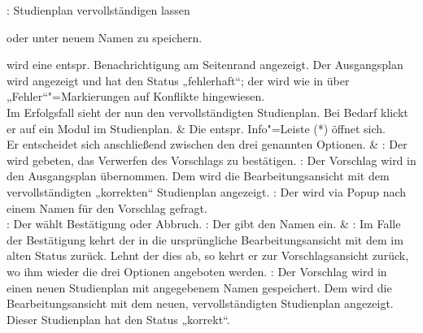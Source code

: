 \begin{usecase}{: Studienplan vervollständigen lassen}
\begin{tblitemize}
		\item oder unter neuem Namen zu speichern.
	\end{tblitemize} \newline
	 wird eine entspr. \gls{Benachrichtigung} am Seitenrand angezeigt. Der Ausgangsplan wird angezeigt und hat den Status „fehlerhaft“; der  wird wie in  über „Fehler“"=Markierungen auf Konflikte hingewiesen. \\
	\hline
	Im Erfolgsfall sieht der  nun den vervollständigten \gls{Studienplan}. Bei Bedarf klickt er auf ein Modul im Studienplan.
	& Die entspr. Info"=Leiste (*) öffnet sich. \\
	\hline
	Er entscheidet sich anschließend zwischen den drei genannten Optionen. 
	& : Der  wird gebeten, das Verwerfen des Vorschlags zu bestätigen. \newline
	: Der Vorschlag wird in den Ausgangsplan übernommen. Dem  wird die Bearbeitungsansicht mit dem vervollständigten „korrekten“ Studienplan angezeigt. \newline
	:  Der  wird via \gls{Popup} nach einem Namen für den Vorschlag gefragt. \\
	\hline
	: Der  wählt Bestätigung oder Abbruch. \newline
	: Der  gibt den Namen ein. 
	& : Im Falle der Bestätigung kehrt der  in die ursprüngliche Bearbeitungsansicht mit dem  im alten Status zurück. Lehnt der  dies ab, so kehrt er zur Vorschlagsansicht zurück, wo ihm wieder die drei Optionen angeboten werden. \newline
	: Der Vorschlag wird in einen neuen Studienplan mit angegebenem Namen gespeichert. Dem  wird die Bearbeitungsansicht mit dem neuen, vervollständigten Studienplan angezeigt. Dieser Studienplan hat den Status „korrekt“.
\end{usecase}


\bigskip

\renewcommand{\arraystretch}{1.0}
\setlength{\LTpre}{\bigskipamount}
\setlength{\LTpost}{\bigskipamount}